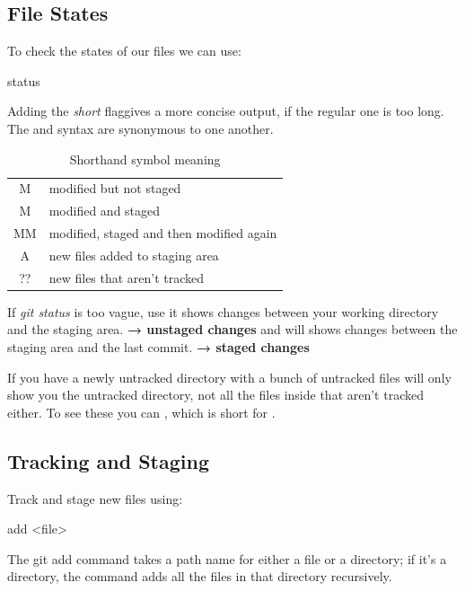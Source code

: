 \subsection{File States}
To check the states of our files we can use:
\begin{gitBashBox}
status
\end{gitBashBox}
\noindent Adding the \textit{short} flag\footnotemark[2] gives a more concise output, if the regular one is too long. The  and  syntax are synonymous to one another.
\begin{table}[H]
    \centering
    \begin{tabular}{c|l}
       \hspace{2mm} M  & modified but not staged\\[2pt]
       M\hspace{3mm}   & modified and staged\\[2pt]
       MM  & modified, staged and then modified again \\[2pt]
       A\hspace{3mm}   & new files added to staging area \\[2pt]
       ?\hspace{0.7mm}?  & new files that aren't tracked \\
       
    \end{tabular}
    \caption{Shorthand symbol meaning}
    \label{tab:short_symbols}
\end{table}

\noindent If \textit{git status} is too vague, use  it shows changes between your working directory and the staging area. \textbf{→ unstaged changes}\newline
{} and \hspace{1mm}\footnotemark[3]\hspace{0.2mm} will shows changes between the staging area and the last commit.  \textbf{→ staged changes}

If you have a newly untracked directory with a bunch of untracked files  will only show you the untracked directory, not all the files inside that aren't tracked either. To see these you can , which is short for .
\subsection{Tracking and Staging}
\noindent Track and stage new files using:
\begin{gitBashBox}
add <file>
\end{gitBashBox}
\noindent The git add command takes a path name for either a file or a directory; if it’s a directory, the command adds all the files in that directory recursively.

